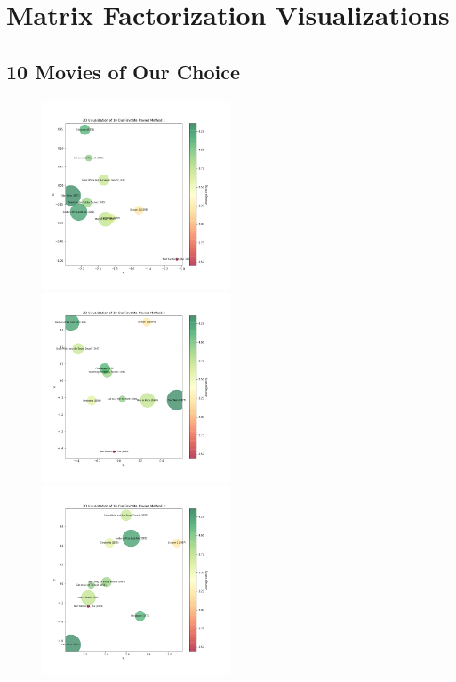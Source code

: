 \documentclass{article}
\begin{document}
\newpage

\section{Matrix Factorization Visualizations}

\subsection{10 Movies of Our Choice}

\begin{figure}[H]
\includegraphics[width=0.5\textwidth]{matrixfactorization/2D Visualization of 10 Our Favorite Movies Method 1.png}
\includegraphics[width=0.5\textwidth]{matrixfactorization/2D Visualization of 10 Our Favorite Movies Method 2.png}
\includegraphics[width=0.5\textwidth]{matrixfactorization/2D Visualization of 10 Our Favorite Movies Method 3.png}
\end{figure}
\end{document}
